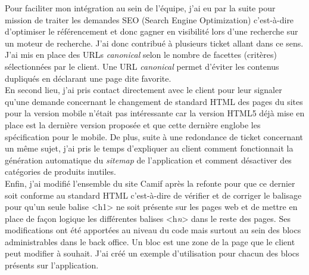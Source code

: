 \documentclass[12pt, a4paper, twoside]{report}
\begin{document}
Pour faciliter mon intégration au sein de l'équipe, j'ai eu par la suite pour mission de traiter les demandes SEO (Search Engine Optimization) c'est-à-dire d'optimiser le référencement et donc gagner en visibilité lors d'une recherche sur un moteur de recherche. J'ai donc contribué à plusieurs ticket allant dans ce sens. J'ai mis en place des URLs \textit{canonical} selon le nombre de facettes (critères) sélectionnées par le client. Une URL \textit{canonical} permet d'éviter les contenus dupliqués en déclarant une page dite favorite. \\
En second lieu, j'ai pris contact directement avec le client pour leur signaler qu'une demande concernant le changement de standard HTML des pages du sites pour la version mobile n'était pas intéressante car la version HTML5 déjà mise en place est la dernière version proposée et que cette dernière englobe les spécification pour le mobile. De plus, suite à une redondance de ticket concernant un même sujet, j'ai pris le temps d'expliquer au client comment fonctionnait la génération automatique du \textit{sitemap} de l'application et comment désactiver des catégories de produits inutiles. \\
Enfin, j'ai modifié l'ensemble du site Camif après la refonte pour que ce dernier soit conforme au standard HTML c'est-à-dire de vérifier et de corriger le balisage pour qu'un seule balise <h1> ne soit présente sur les pages web et de mettre en place de façon logique les différentes balises <h\textit{n}> dans le reste des pages. Ses modifications ont été apportées au niveau du code mais surtout au sein des blocs administrables dans le back office. Un bloc est une zone de la page que le client peut modifier à souhait. J'ai créé un exemple d'utilisation pour chacun des blocs présents sur l'application.  
\end{document}
